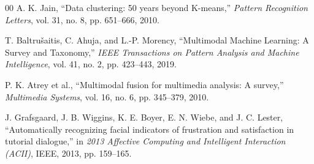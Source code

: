 \documentclass[conference]{IEEEtran}
\begin{document}
\begin{thebibliography}{00}
 A. K. Jain, ``Data clustering: 50 years beyond K-means,'' \textit{Pattern Recognition Letters}, vol. 31, no. 8, pp. 651--666, 2010.

 T. Baltru\v{s}aitis, C. Ahuja, and L.-P. Morency, ``Multimodal Machine Learning: A Survey and Taxonomy,'' \textit{IEEE Transactions on Pattern Analysis and Machine Intelligence}, vol. 41, no. 2, pp. 423--443, 2019.

 P. K. Atrey et al., ``Multimodal fusion for multimedia analysis: A survey,'' \textit{Multimedia Systems}, vol. 16, no. 6, pp. 345--379, 2010.

 J. Grafsgaard, J. B. Wiggins, K. E. Boyer, E. N. Wiebe, and J. C. Lester, ``Automatically recognizing facial indicators of frustration and satisfaction in tutorial dialogue,'' in \textit{2013 Affective Computing and Intelligent Interaction (ACII)}, IEEE, 2013, pp. 159--165.

\end{thebibliography}
\end{document}
